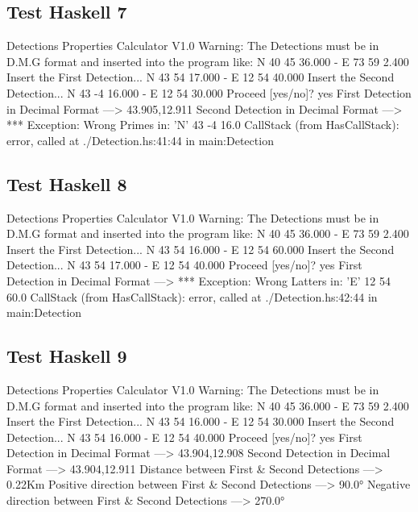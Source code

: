 \documentclass{article}
\begin{document}
\subsection*{Test Haskell 7}
	\begin{spverbatim}
		Detections Properties Calculator V1.0 
		Warning: The Detections must be in D.M.G format and inserted into the program like: N 40 45 36.000 - E 73 59 2.400
		Insert the First Detection...
		N 43 54 17.000 - E 12 54 40.000
		Insert the Second Detection...
		N 43 -4 16.000 - E 12 54 30.000
		Proceed [yes/no]?
		yes
		First Detection in Decimal Format ---> 43.905,12.911
		Second Detection in Decimal Format ---> *** Exception: Wrong Primes in:  'N' 43 -4 16.0
		CallStack (from HasCallStack):
		error, called at ./Detection.hs:41:44 in main:Detection
	\end{spverbatim}

\subsection*{Test Haskell 8}
	\begin{spverbatim}
		Detections Properties Calculator V1.0 
		Warning: The Detections must be in D.M.G format and inserted into the program like: N 40 45 36.000 - E 73 59 2.400
		Insert the First Detection...
		N 43 54 16.000 - E 12 54 60.000
		Insert the Second Detection...
		N 43 54 17.000 - E 12 54 40.000
		Proceed [yes/no]?
		yes
		First Detection in Decimal Format ---> *** Exception: Wrong Latters in:  'E' 12 54 60.0
		CallStack (from HasCallStack):
		error, called at ./Detection.hs:42:44 in main:Detection
	\end{spverbatim}

\subsection*{Test Haskell 9}
	\begin{spverbatim}
		Detections Properties Calculator V1.0 
		Warning: The Detections must be in D.M.G format and inserted into the program like: N 40 45 36.000 - E 73 59 2.400
		Insert the First Detection...
		N 43 54 16.000 - E 12 54 30.000
		Insert the Second Detection...
		N 43 54 16.000 - E 12 54 40.000
		Proceed [yes/no]?
		yes
		First Detection in Decimal Format ---> 43.904,12.908
		Second Detection in Decimal Format ---> 43.904,12.911
		Distance between First & Second Detections ---> 0.22Km
		Positive direction between First & Second Detections ---> 90.0°
		Negative direction between First & Second Detections ---> 270.0°
	\end{spverbatim}
\end{document}
